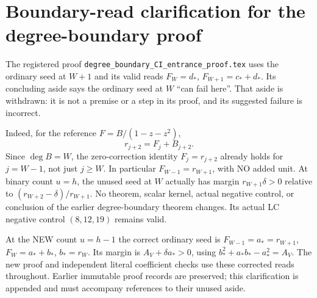 \section{Boundary-read clarification for the degree-boundary proof}
The registered proof \texttt{degree\_boundary\_CI\_entrance\_proof.tex}
uses the ordinary seed at $W+1$ and its valid reads $F_W=d_*$,
$F_{W+1}=c_*+d_*$. Its concluding aside says the ordinary seed at
$W$ ``can fail here''. That aside is withdrawn: it is not a premise
or a step in its proof, and its suggested failure is incorrect.

Indeed, for the reference $F=B/(1-z-z^2)$,
\[
             r_{j+2}=F_j+B_{j+2}.
\]
Since $\deg B=W$, the zero-correction identity $F_j=r_{j+2}$
already holds for $j=W-1$, not just $j\ge W$.
In particular $F_{W-1}=r_{W+1}$, with NO added unit.
At binary count $u=h$, the unused seed at $W$ actually has margin
$r_{W+1}\delta>0$ relative to
$(r_{W+2}-\delta)/r_{W+1}$.
No theorem, scalar kernel, actual negative control, or conclusion
of the earlier degree-boundary theorem changes. Its actual LC
negative control $(8,12,19)$ remains valid.

At the NEW count $u=h-1$ the correct ordinary seed is
$F_{W-1}=a_*=r_{W+1}$, $F_W=a_*+b_*$, $b_*=r_W$.
Its margin is $A_V+\delta a_*>0$, using
$b_*^2+a_*b_*-a_*^2=A_V$. The new proof and independent literal
coefficient checks use these corrected reads throughout.
Earlier immutable proof records are preserved; this clarification
is appended and must accompany references to their unused aside.
